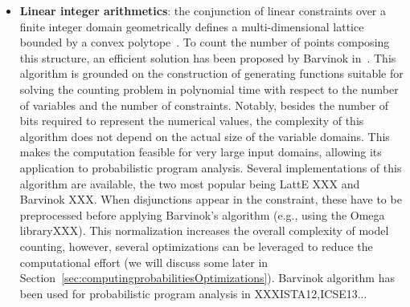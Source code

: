 \begin{itemize}
	\item \textbf{Linear integer arithmetics}: the conjunction of linear constraints over a finite integer domain geometrically defines a multi-dimensional lattice bounded by a convex polytope~\cite{de2008computationalGeometry}. To count the number of points composing this structure, an efficient solution has been proposed by Barvinok in~\cite{barvinok1994polynomial}. This algorithm is grounded on the construction of generating functions suitable for solving the counting problem in polynomial time with respect to the number of variables and the number of constraints. Notably, besides the number of bits required to represent the numerical values, the complexity of this algorithm does not depend on the actual size of the variable domains. This makes the computation feasible for very large input domains, allowing its application to probabilistic program analysis. Several implementations of this algorithm are available, the two most popular being LattE XXX and Barvinok XXX. When disjunctions appear in the constraint, these have to be preprocessed before applying Barvinok's algorithm (e.g., using the Omega libraryXXX). This normalization increases the overall complexity of model counting, however, several optimizations can be leveraged to reduce the computational effort (we will discuss some later in Section~\ref{sec:computingprobabilitiesOptimizations}). Barvinok algorithm has been used for probabilistic program analysis in XXXISTA12,ICSE13...


\end{itemize}
